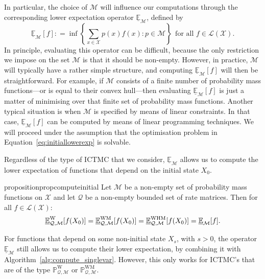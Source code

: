 \documentclass[10pt,a4paper]{paper}
\theoremstyle{definition}
\newcommand{\states}{\mathcal{X}}
\newcommand{\processes}{\mathbb{P}}
\newcommand{\wprocesses}{\processes^{\mathrm{W}}}
\newcommand{\wmprocesses}{\processes^{\mathrm{WM}}}
\newcommand{\gambles}{\mathcal{L}}
\newcommand{\gamblesX}{\gambles(\states)}
\newcommand{\rateset}{\mathcal{Q}}
\newcommand{\coloneqq}{:\!=}
\newcommand{\ictmc}{{ICTMC}}
\begin{document}
In particular, the choice of $\mathcal{M}$ will influence our computations through the corresponding lower expectation operator $\underline{\mathbb{E}}_{\mathcal{M}}$, defined by
\begin{equation}\label{eq:initiallowerexp}
\underline{\mathbb{E}}_{\mathcal{M}}[f]
\coloneqq
\inf
\left\{\sum_{x\in\states}p(x)f(x)\colon p\in\mathcal{M}\right\}
~~\text{for all $f\in\gamblesX$.}
\end{equation}
In principle, evaluating this operator can be difficult, because the only restriction we impose on the set $\mathcal{M}$ is that it should be non-empty. However, in practice, $\mathcal{M}$ will typically have a rather simple  structure, and computing $\underline{\mathbb{E}}_\mathcal{M}[f]$ will then be straightforward. For example, if $\mathcal{M}$ consists of a finite number of probability mass functions---or is equal to their convex hull---then evaluating $\underline{\mathbb{E}}_\mathcal{M}[f]$ is just a matter of minimising over that finite set of probability mass functions.
Another typical situation is when $\mathcal{M}$ is specified by means of linear constraints. In that case, $\underline{\mathbb{E}}_\mathcal{M}[f]$ can be computed by means of linear programming techniques. We will proceed under the assumption that the optimisation problem in Equation~\eqref{eq:initiallowerexp} is solvable.

Regardless of the type of {\ictmc} that we consider, $\underline{\mathbb{E}}_{\mathcal{M}}$ allows us to compute the lower expectation of functions that depend on the initial state $X_0$.

\begin{restatable}{proposition}{propcomputeinitial}
\label{prop:computeinitial}
Let $\mathcal{M}$ be a non-empty set of probability mass functions on $\states$ and let $\rateset$ be a non-empty bounded set of rate matrices. Then for all $f\in\gamblesX$:
\begin{equation*}
\underline{\mathbb{E}}^\mathrm{W}_{\rateset,\mathcal{M}}[f(X_0)]
=
\underline{\mathbb{E}}^\mathrm{WM}_{\rateset,\mathcal{M}}[f(X_0)]
=
\underline{\mathbb{E}}^\mathrm{WHM}_{\rateset,\mathcal{M}}[f(X_0)]
=
\underline{\mathbb{E}}_{\mathcal{M}}[f].\vspace{4pt}
\end{equation*}
\end{restatable}

For functions that depend on some non-initial state $X_s$, with $s>0$, the operator $\underline{\mathbb{E}}_{\mathcal{M}}$ still allows us to compute their lower expectation, by combining it with Algorithm~\ref{alg:compute_singlevar}. However, this only works for {\ictmc}'s that are of the type $\wprocesses_{\rateset,\mathcal{M}}$ or $\wmprocesses_{\rateset,\mathcal{M}}$.
\end{document}
